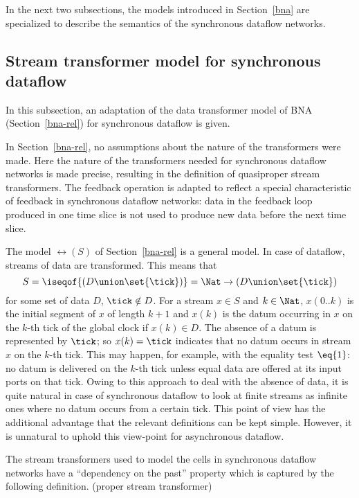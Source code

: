 \documentclass[fleqn]{llncs}
\begin{document}
In the next two subsections, the models introduced in Section~\ref{bna}
are specialized to describe the semantics of the synchronous dataflow
networks.

\subsection{Stream transformer model for synchronous dataflow}
\label{na-s-qrel}
In this subsection, an adaptation of the data transformer model of BNA
(Section~\ref{bna-rel}) for synchronous dataflow is given.

In Section~\ref{bna-rel}, no assumptions about the nature of the
transformers were made.
Here the nature of the transformers needed for synchronous dataflow
networks is made precise, resulting in the definition of quasiproper
stream transformers.
The feedback operation is adapted to reflect a special characteristic of
feedback in synchronous dataflow networks: data in the feedback loop
produced in one time slice is not used to produce new data before the
next time slice.

The model $\rel(S)$ of Section~\ref{bna-rel} is a general model.
In case of dataflow, streams of data are transformed.
This means that
$$
S = \iseqof{(D \union \set{\tick})} = \Nat \to (D \union \set{\tick})
$$
for some set of data $D$, $\tick \notin D$.
For a stream $x \in S$ and $k \in \Nat$, $x(0..k)$ is the initial 
segment of $x$ of length $k + 1$ and $x(k)$ is the datum occurring in 
$x$ on the $k$-th tick of the global clock if $x(k) \in D$.
The absence of a datum is represented by $\tick$; so $x(k) = \tick$
indicates that no datum occurs in stream $x$ on the $k$-th tick.
This may happen, for example, with the equality test $\eq{1}$: no datum
is delivered on the $k$-th tick unless equal data are offered at its
input ports on that tick.
Owing to this approach to deal with the absence of data, it is quite
natural in case of synchronous dataflow to look at finite streams as
infinite ones where no datum occurs from a certain tick.
This point of view has the additional advantage that the relevant
definitions can be kept simple.
However, it is unnatural to uphold this view-point for asynchronous
dataflow.

The stream transformers used to model the cells in synchronous dataflow
networks have a ``dependency on the past'' property which is captured by
the following definition.
\bdfn (proper stream transformer)
\label{dfn-proper}
\end{document}
